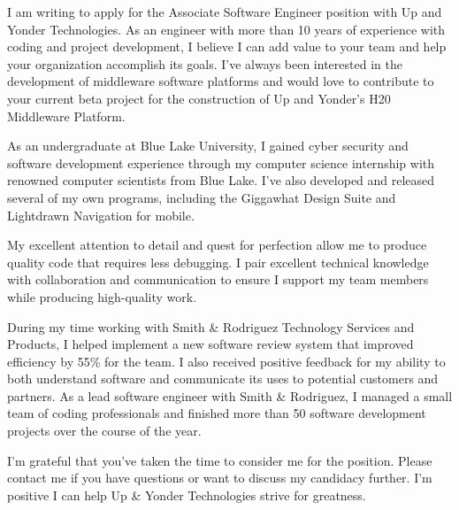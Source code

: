 I am writing to apply for the Associate Software Engineer position with Up and Yonder Technologies. As an engineer with more than 10 years of experience with coding and project development, I believe I can add value to your team and help your organization accomplish its goals. I've always been interested in the development of middleware software platforms and would love to contribute to your current beta project for the construction of Up and Yonder's H20 Middleware Platform.

As an undergraduate at Blue Lake University, I gained cyber security and software development experience through my computer science internship with renowned computer scientists from Blue Lake. I've also developed and released several of my own programs, including the Giggawhat Design Suite and Lightdrawn Navigation for mobile.

My excellent attention to detail and quest for perfection allow me to produce quality code that requires less debugging. I pair excellent technical knowledge with collaboration and communication to ensure I support my team members while producing high-quality work.

During my time working with Smith \& Rodriguez Technology Services and Products, I helped implement a new software review system that improved efficiency by 55\% for the team. I also received positive feedback for my ability to both understand software and communicate its uses to potential customers and partners. As a lead software engineer with Smith \& Rodriguez, I managed a small team of coding professionals and finished more than 50 software development projects over the course of the year.

I'm grateful that you've taken the time to consider me for the position. Please contact me if you have questions or want to discuss my candidacy further. I'm positive I can help Up \& Yonder Technologies strive for greatness.